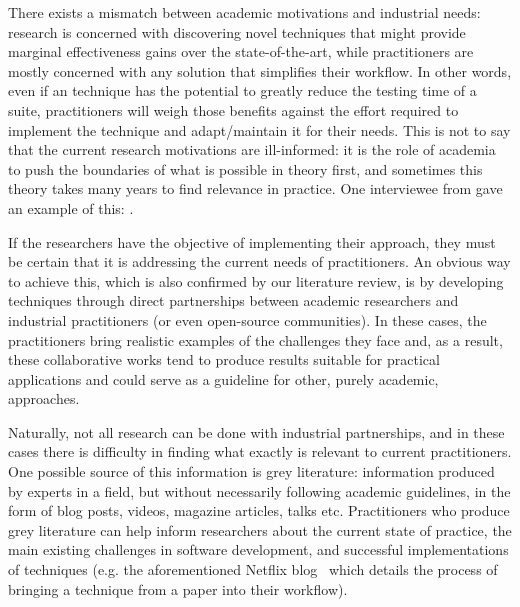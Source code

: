 There exists a mismatch between academic motivations and industrial needs: research is concerned with discovering novel techniques that might provide marginal effectiveness gains over the state-of-the-art, while practitioners are mostly concerned with any solution that simplifies their workflow.
In other words, even if an \rt technique has the potential to greatly reduce the testing time of a suite, practitioners will weigh those benefits against the effort required to implement the technique and adapt/maintain it for their needs.
This is not to say that the current research motivations are ill-informed: it is the role of academia to push the boundaries of what is possible in theory first, and sometimes this theory takes many years to find relevance in practice.
One interviewee from  gave an example of this: .

If the researchers have the objective of implementing their approach, they must be certain that it is addressing the current needs of practitioners.
An obvious way to achieve this, which is also confirmed by our literature review, is by developing techniques through direct partnerships between academic researchers and industrial practitioners (or even open-source communities).
In these cases, the practitioners bring realistic examples of the challenges they face and, as a result, these collaborative works tend to produce results suitable for practical applications and could serve as a guideline for other, purely academic, approaches.

Naturally, not all research can be done with industrial partnerships, and in these cases there is difficulty in finding what exactly is relevant to current practitioners.
One possible source of this information is grey literature: information produced by experts in a field, but without necessarily following academic guidelines, in the form of blog posts, videos, magazine articles, talks etc.
Practitioners who produce grey literature can help inform researchers about the current state of practice, the main existing challenges in software development, and successful implementations of techniques (e.g. the aforementioned Netflix blog~\cite{netflixlerner} which details the process of bringing a technique from a paper into their workflow).

